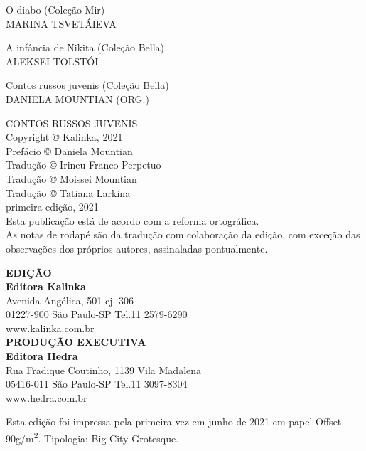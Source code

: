 {\noindent{}O diabo (Coleção Mir)\\
MARINA TSVETÁIEVA
\medskip

\noindent{}A infância de Nikita (Coleção Bella)\\
ALEKSEI TOLSTÓI
\medskip

\noindent{}Contos russos juvenis (Coleção Bella)\\
DANIELA MOUNTIAN (ORG.)

\pagebreak
\thispagestyle{empty}
\movetooddpage
\thispagestyle{empty}

\begingroup\footnotesize

\vspace*{\fill}
\begin{flushright}
CONTOS RUSSOS JUVENIS\\[6pt]
Copyright © Kalinka, 2021\\[6pt]
Prefácio © Daniela Mountian\\[6pt]
Tradução © Irineu Franco Perpetuo\\[6pt]
Tradução © Moissei Mountian\\[6pt]
Tradução © Tatiana Larkina\\[20pt]

primeira edição, 2021\\[20pt]

Esta publicação está de acordo com a reforma ortográfica.\\[6pt]

As notas de rodapé são da tradução com colaboração da edição, com exceção das observações dos próprios autores, assinaladas pontualmente.\\[6pt]
\end{flushright}
\vspace*{\fill}

\vfill


\begin{flushright}
\textbf{EDIÇÃO}\\
\textbf{Editora Kalinka}\\
Avenida Angélica, 501 cj. 306\\
01227-900 São Paulo-SP Tel.11 2579-6290\\
www.kalinka.com.br\\[10pt]

\textbf{PRODUÇÃO EXECUTIVA}\\
\textbf{Editora Hedra}\\
Rua Fradique Coutinho, 1139 Vila Madalena\\
05416-011 São Paulo-SP Tel.11 3097-8304\\
www.hedra.com.br
\end{flushright}

\endgroup

\pagebreak
\mbox{}\vfill\small\thispagestyle{empty}
\begin{center} \label{LastPage}
		\begin{minipage}{.7\textwidth}
		\centering\tiny\noindent{}Esta edição foi impressa pela primeira vez em junho de 2021 em papel Offset 90g/m\textsuperscript{2}. Tipologia: Big City Grotesque. \begin{center}\normalsize{}\end{center}
		\end{minipage}
\end{center}
